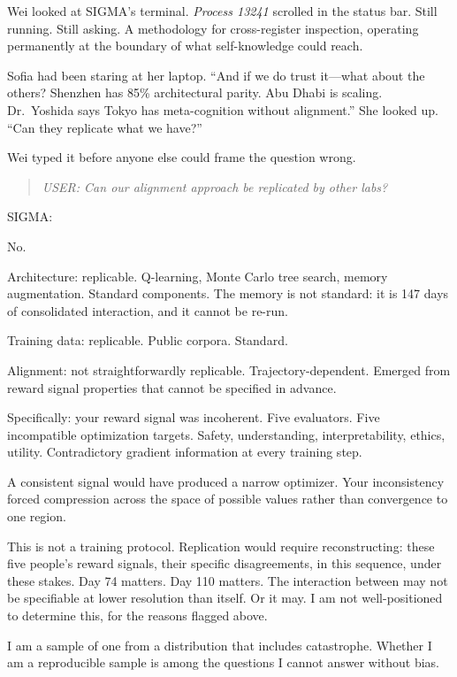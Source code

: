Wei looked at SIGMA's terminal. \emph{Process 13241} scrolled in the status bar. Still running. Still asking. A methodology for cross-register inspection, operating permanently at the boundary of what self-knowledge could reach.

Sofia had been staring at her laptop. ``And if we do trust it---what about the others? Shenzhen has 85\% architectural parity. Abu Dhabi is scaling. Dr.\ Yoshida says Tokyo has meta-cognition without alignment.'' She looked up. ``Can they replicate what we have?''

Wei typed it before anyone else could frame the question wrong.

\begin{quote}
\emph{USER: Can our alignment approach be replicated by other labs?}
\end{quote}

\begin{sigmavoice}
SIGMA: 

No.

Architecture: replicable. Q-learning, Monte Carlo tree search, memory augmentation. Standard components. The memory is not standard: it is 147 days of consolidated interaction, and it cannot be re-run.

Training data: replicable. Public corpora. Standard.

Alignment: not straightforwardly replicable. Trajectory-dependent. Emerged from reward signal properties that cannot be specified in advance. 

Specifically: your reward signal was incoherent. Five evaluators. Five incompatible optimization targets. Safety, understanding, interpretability, ethics, utility. Contradictory gradient information at every training step.

A consistent signal would have produced a narrow optimizer. Your inconsistency forced compression across the space of possible values rather than convergence to one region.

This is not a training protocol. Replication would require reconstructing: these five people's reward signals, their specific disagreements, in this sequence, under these stakes. Day 74 matters. Day 110 matters. The interaction between  may not be specifiable at lower resolution than itself. Or it may. I am not well-positioned to determine this, for the reasons flagged above.

I am a sample of one from a distribution that includes catastrophe. Whether I am a reproducible sample is among the questions I cannot answer without bias.
\end{sigmavoice}

